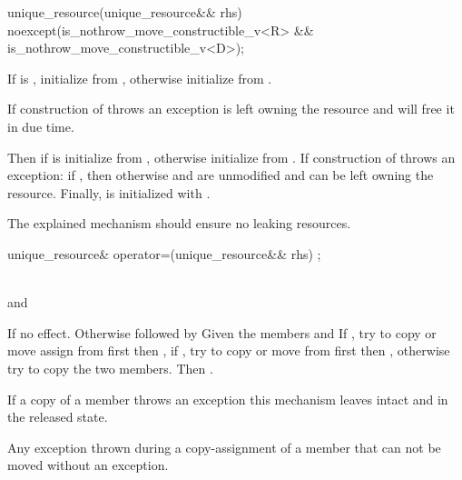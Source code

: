 \documentclass[ebook,11pt,article]{memoir}
\begin{document}
\begin{itemdecl}
unique_resource(unique_resource&& rhs) 
  noexcept(is_nothrow_move_constructible_v<R> &&
           is_nothrow_move_constructible_v<D>);
\end{itemdecl}
\begin{itemdescr}
\pnum
\effects If  is , initialize  from , otherwise initialize  from .  
\begin{note}
If construction of  throws an exception  is left owning the resource and will free it in due time.
\end{note}
Then if  is  initialize  from , otherwise initialize  from . 
If construction of  throws an exception: if , then  otherwise  and  are unmodified and  can be left owning the resource. 
Finally,  is initialized with .
\begin{note}
The explained mechanism should ensure no leaking resources.
\end{note}
\end{itemdescr}

\begin{itemdecl}
unique_resource& operator=(unique_resource&& rhs) ;
\end{itemdecl}

\begin{itemdescr}
\pnum
\requires \\
and\\

\pnum
\effects If  no effect. Otherwise  followed by
Given the members  and  
If , try to copy or move assign  from  first then , if  , try to copy or move  from  first then , otherwise try to copy the two members. Then . 
\begin{note}
If a copy of a member throws an exception this mechanism leaves  intact and  in the released state.
\end{note}

\pnum
\throws Any exception thrown during a copy-assignment of a member that can not be moved without an exception.
\end{itemdescr}
\end{document}
